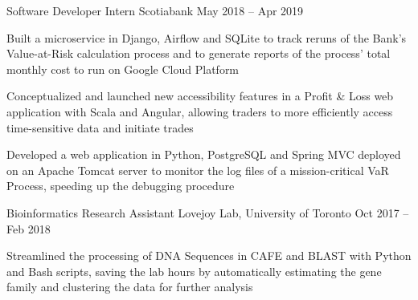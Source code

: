 \begin{cventries}
  \cventry
    {Software Developer Intern}
    {Scotiabank}
    {}
    {May 2018 -- Apr 2019}
    {}
    {
      \begin{cvitems}
        \item {Built a microservice in Django, Airflow and SQLite to track reruns of the Bank's Value-at-Risk calculation process and to generate reports of the process' total monthly cost to run on Google Cloud Platform}
        \item {Conceptualized and launched new accessibility features in a Profit \& Loss web application with Scala and Angular, allowing traders to more efficiently access time-sensitive data and initiate trades}
        \item {Developed a web application in Python, PostgreSQL and Spring MVC deployed on an Apache Tomcat server to monitor the log files of a mission-critical VaR Process, speeding up the debugging procedure}
      \end{cvitems}
    }

  \cventry
    {Bioinformatics Research Assistant}
    {Lovejoy Lab, University of Toronto}
    {}
    {Oct 2017 -- Feb 2018}
    {}
    {
      \begin{cvitems}
        \item {Streamlined the processing of DNA Sequences in CAFE and BLAST with Python and Bash scripts, saving the lab hours by automatically estimating the gene family and clustering the data for further analysis}
      \end{cvitems}
    }
\end{cventries}
